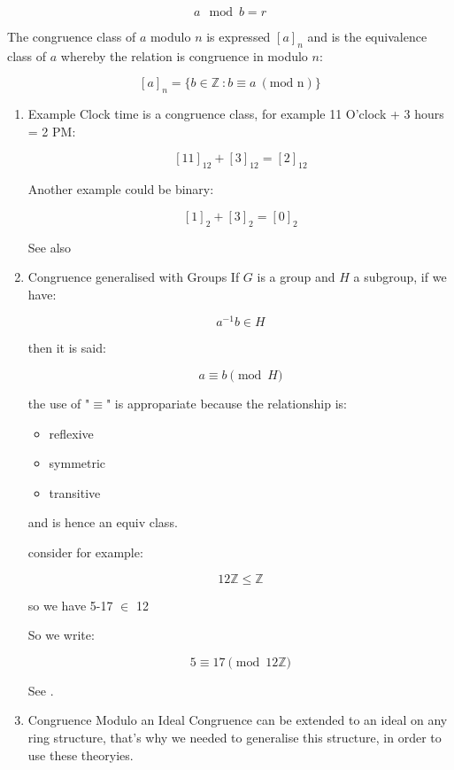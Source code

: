 \documentclass[a4paper,11pt,twoside]{article}
\begin{document}
\[
      a \mod b = r
      \]


The congruence class of \(a\) modulo \(n\) is expressed
\(\left[a\right]_n\) and is the equivalence class of \(a\) whereby
the relation is congruence in modulo \(n\):

\[\left\lbrack a \right\rbrack_{n} = \{ b\mathbb{\in Z\ :}b \equiv a\ \left( \text{mod\ n} \right)\}\]   


\begin{enumerate}
\item Example
\label{sec:org35225fe}
Clock time is a congruence class, for example 11 O'clock + 3 hours
= 2 PM:

\[
       \left[11\right]_{12}+\left[3\right]_{12}=\left[2\right]_{12}
       \]

Another example could be binary:


\[
       \left[1\right]_{2}+\left[3\right]_{2}=\left[0\right]_{2}
       \]


See also \cite[\S 4c]{roberthowlettUndergraduateCourseAbstract}

\item Congruence generalised with Groups
\label{sec:org618b634}
If \(G\) is a group and \(H\) a subgroup, if we have:

\[
       a^{-1}b \in H
       \]

then it is said:

\[
       a \equiv b \pmod{H}
       \]

the use of "\(\equiv\)" is appropariate because the relationship
is:

\begin{itemize}
\item reflexive
\item symmetric
\item transitive
\end{itemize}

and is hence an equiv class.

consider for example:

\[
       12 \mathbb{Z} \leqslant \mathbb{Z}
       \]

so we have 5-17 \(\in\) 12 

So we write:

\[
       5 \equiv 17 \pmod{12\mathbb{Z}}
       \]

See \cite[\S 3.7]{gregoryleeAbstractAlgebra2018}.

\item Congruence Modulo an Ideal
\label{sec:orgb24e478}
Congruence can be extended to an ideal on any ring structure,
that's why we needed to generalise this structure, in order to use
these theoryies.


\end{enumerate}
\end{document}
